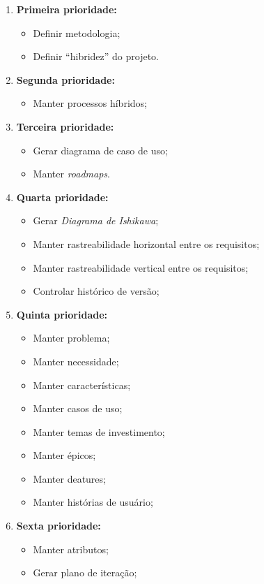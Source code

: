\begin{enumerate}
	\item \textbf{Primeira prioridade:}
		\begin{itemize}
			\item Definir metodologia;
			\item Definir ``hibridez'' do projeto.
		\end{itemize}
	\item \textbf{Segunda prioridade:}
		\begin{itemize}
			\item Manter processos híbridos;
		\end{itemize}
	\item \textbf{Terceira prioridade:}
		\begin{itemize}
			\item Gerar diagrama de caso de uso;
			\item Manter \textit{roadmaps}.
		\end{itemize}
	\item \textbf{Quarta prioridade:}
		\begin{itemize}
			\item Gerar \textit{Diagrama de Ishikawa};
			\item Manter rastreabilidade horizontal entre os requisitos;
			\item Manter rastreabilidade vertical entre os requisitos;
			\item Controlar histórico de versão;
		\end{itemize}
	\item \textbf{Quinta prioridade:}
		\begin{itemize}
			\item Manter problema;
			\item Manter necessidade;
			\item Manter características;
			\item Manter casos de uso;
			\item Manter temas de investimento;
			\item Manter épicos;
			\item Manter deatures;
			\item Manter histórias de usuário;
		\end{itemize}
	\item \textbf{Sexta prioridade:}
		\begin{itemize}
			\item Manter atributos;
			\item Gerar plano de iteração;
		\end{itemize}
\end{enumerate}

